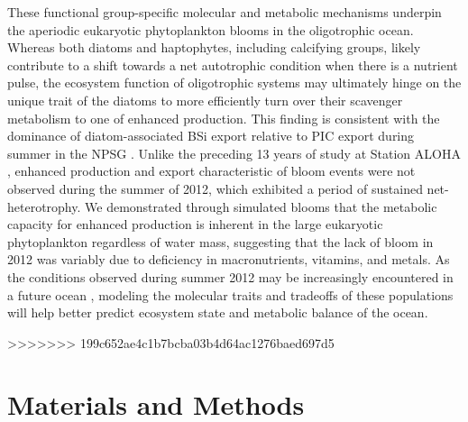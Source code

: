 These functional group-specific molecular and metabolic mechanisms underpin the aperiodic eukaryotic phytoplankton blooms in the oligotrophic ocean. Whereas both diatoms and haptophytes, including calcifying groups, likely contribute to a shift towards a net autotrophic condition when there is a nutrient pulse, the ecosystem function of oligotrophic systems may ultimately hinge on the unique trait of the diatoms to more efficiently turn over their scavenger metabolism to one of enhanced production. This finding is consistent with the dominance of diatom-associated BSi export relative to PIC export during summer in the NPSG \citep{Karl2012}. Unlike the preceding 13 years of study at Station ALOHA \citep{Karl2012}, enhanced production and export characteristic of bloom events were not observed during the summer of 2012, which exhibited a period of sustained net-heterotrophy. We demonstrated through simulated blooms that the metabolic capacity for enhanced production is inherent in the large eukaryotic phytoplankton regardless of water mass, suggesting that the lack of bloom in 2012 was variably due to deficiency in macronutrients, vitamins, and metals. As the conditions observed during summer 2012 may be increasingly encountered in a future ocean \citep{Doney2012}, modeling the molecular traits and tradeoffs of these populations will help better predict ecosystem state and metabolic balance of the ocean. \par

>>>>>>> 199c652ae4c1b7bcba03b4d64ac1276baed697d5
\section{Materials and Methods}
